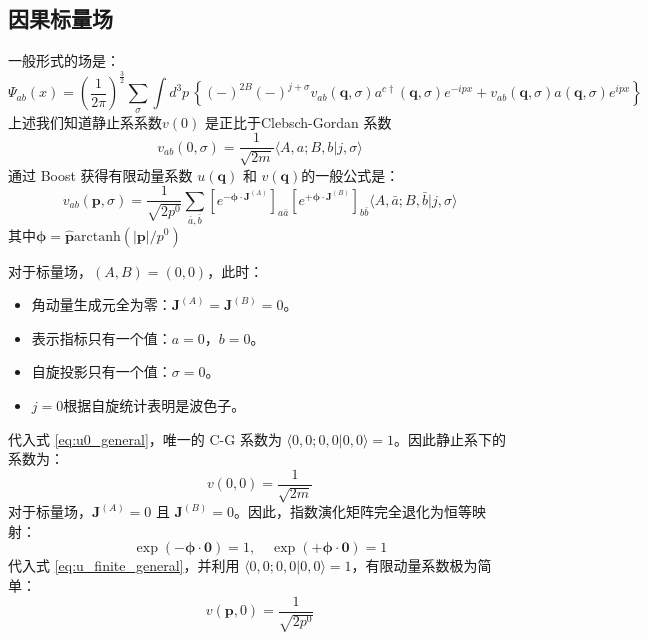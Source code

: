 \subsection{因果标量场 }
一般形式的场是：
\begin{equation}
    \Psi_{ab}(x) =(\frac{1}{2\pi})^\frac{3}{2}\sum_{\sigma}\int d^3p \, \left\{ (-)^{2B}(-)^{j+\sigma}v_{ab}(\boldsymbol{q},\sigma)a^{c\dagger}(\boldsymbol{q},\sigma) e^{-ipx} + v_{ab}(\boldsymbol{q},\sigma) a(\boldsymbol{q},\sigma)e^{ipx} \right\}
\end{equation}
上述我们知道静止系系数$v(0)$ 是正比于Clebsch-Gordan  系数 
\begin{equation}
    v_{ab}(0, \sigma) = \frac{1}{\sqrt{2m}} \langle A, a; B, b | j, \sigma \rangle
    \label{eq:u0_general}
\end{equation}
通过 Boost 获得有限动量系数 $u(\boldsymbol{q})$ 和 $v(\boldsymbol{q})$的一般公式是：
\begin{equation}
    v_{ab}(\boldsymbol{p}, \sigma) = \frac{1}{\sqrt{2p^0}} \sum_{\bar{a},\bar{b}} \left[e^{-\boldsymbol{\phi}\cdot\mathbf{J}^{(A)}}\right]_{a\bar{a}} \left[e^{+\boldsymbol{\phi}\cdot\mathbf{J}^{(B)}}\right]_{b\bar{b}} \langle A,\bar{a}; B,\bar{b} | j, \sigma \rangle
    \label{eq:u_finite_general}
\end{equation}
其中$\boldsymbol{\phi} = \hat{\boldsymbol{p}} \text{arctanh}(|\boldsymbol{p}|/p^0)$


对于标量场，$(A, B) = (0, 0)$，此时：
\begin{itemize}
    \item 角动量生成元全为零：$\mathbf{J}^{(A)} = \mathbf{J}^{(B)} = 0$。
    \item 表示指标只有一个值：$a = 0$，$b = 0$。
    \item 自旋投影只有一个值：$\sigma = 0$。
    \item $j=0$根据自旋统计表明是波色子。
\end{itemize}
代入式 \eqref{eq:u0_general}，唯一的 C-G 系数为 $\langle 0, 0; 0, 0 | 0, 0 \rangle = 1$。因此静止系下的系数为：
\begin{equation}
    v(0, 0) = \frac{1}{\sqrt{2m}}
\end{equation}
\vspace{2ex}
对于标量场，$\mathbf{J}^{(A)} = 0$ 且 $\mathbf{J}^{(B)} = 0$。因此，指数演化矩阵完全退化为恒等映射：
\begin{equation}
    \exp(-\boldsymbol{\phi}\cdot\mathbf{0}) = 1, \quad \exp(+\boldsymbol{\phi}\cdot\mathbf{0}) = 1
\end{equation}
代入式 \eqref{eq:u_finite_general}，并利用 $\langle 0,0;0,0|0,0\rangle = 1$，有限动量系数极为简单：
\begin{equation}
    v(\boldsymbol{p}, 0) = \frac{1}{\sqrt{2p^0}}
\end{equation}


